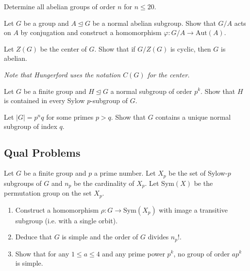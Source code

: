 \begin{problem}[Hungerford 2.2.12.b]
\label{prob:1.4}
Determine all abelian groups of order $n$ for $n\leq 20$.
\end{problem}

\begin{problem}[Hungerford 2.4.1]
\label{prob:1.5}
Let $G$ be a group and $A \trianglelefteq G$ be a normal abelian subgroup. Show that $G/A$ acts on $A$ by conjugation and construct a homomorphism $\varphi: G/A \to \mathrm{Aut}(A)$.
\end{problem}

\begin{problem}[Hungerford 2.4.9]
\label{prob:1.6}
Let $Z(G)$ be the center of $G$. Show that if $G/Z(G)$ is cyclic, then $G$ is abelian.

\textit{Note that Hungerford uses the notation $C(G)$ for the center.}
\end{problem}

\begin{problem}[Hungerford 2.5.6]
\label{prob:1.7}
Let $G$ be a finite group and $H \trianglelefteq G$ a normal subgroup of order $p^k$. Show that $H$ is contained in every Sylow $p$-subgroup of $G$.
\end{problem}

\begin{problem}[Hungerford 2.5.9]
\label{prob:1.8}
Let $\left| G \right| = p^n q$ for some primes $p > q$. Show that $G$ contains a unique normal subgroup of index $q$.
\end{problem}

\subsection{Qual Problems}

\begin{problem}
\label{prob:1.9}
Let $G$ be a finite group and $p$ a prime number. Let $X_p$ be the set of Sylow-$p$ subgroups of $G$ and $n_p$ be the cardinality of $X_p$. Let $\mathrm{Sym}(X)$ be the permutation group on the set $X_p$.
    \begin{enumerate}
        \item Construct a homomorphism $\rho: G \to \mathrm{Sym}(X_p)$ with image a transitive subgroup (i.e. with a single orbit).
        \item Deduce that $G$ is simple and the order of $G$ divides $n_p!$.
        \item Show that for any $1\leq a \leq 4$ and any prime power $p^k$, no group of order $ap^k$ is simple.
    \end{enumerate}
\end{problem}

